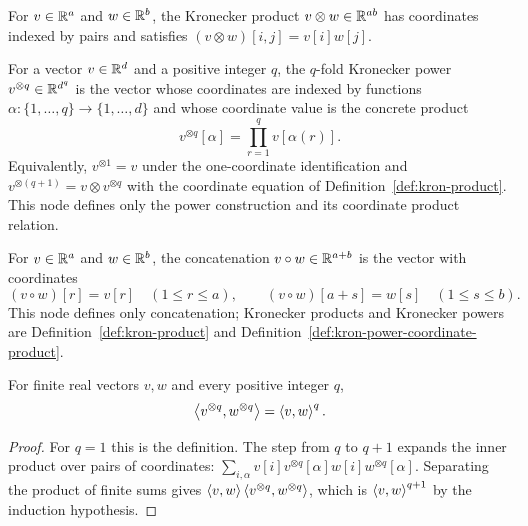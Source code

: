 \begin{definition}
  \label{def:kron-product}
  For $v\in\mathbb{R}^a$ and $w\in\mathbb{R}^b$, the Kronecker product $v\otimes w\in\mathbb{R}^{ab}$
  has coordinates indexed by pairs and satisfies $(v\otimes w)[i,j]=v[i]w[j]$.
\end{definition}

\begin{definition}
  \label{def:kron-power-coordinate-product}
  For a vector $v\in\mathbb{R}^d$ and a positive integer $q$, the $q$-fold Kronecker
  power $v^{\otimes q}\in\mathbb{R}^{d^q}$ is the vector whose coordinates are indexed
  by functions $\alpha:\{1,\ldots,q\}\to\{1,\ldots,d\}$ and whose coordinate
  value is the concrete product
  \[
    v^{\otimes q}[\alpha]=\prod_{r=1}^{q} v[\alpha(r)].
  \]
  Equivalently, $v^{\otimes 1}=v$ under the one-coordinate identification and
  $v^{\otimes(q+1)}=v\otimes v^{\otimes q}$ with the coordinate equation of
  Definition~\ref{def:kron-product}.  This node defines only the power
  construction and its coordinate product relation.
\end{definition}

\begin{definition}
  \label{def:kron-concat}
  For $v\in\mathbb{R}^a$ and $w\in\mathbb{R}^b$, the concatenation
  $v\circ w\in\mathbb{R}^{a+b}$ is the vector with coordinates
  \[
    (v\circ w)[r]=v[r]\quad(1\leq r\leq a),
    \qquad
    (v\circ w)[a+s]=w[s]\quad(1\leq s\leq b).
  \]
  This node defines only concatenation; Kronecker products and Kronecker powers
  are Definition~\ref{def:kron-product} and
  Definition~\ref{def:kron-power-coordinate-product}.
\end{definition}

\begin{lemma}
  \label{lem:kron-inner}
  For finite real vectors $v,w$ and every positive integer $q$,
  \[
    \left\langle v^{\otimes q},w^{\otimes q}\right\rangle=\left\langle v,w\right\rangle^{q}.
  \]
\end{lemma}
\begin{proof}
  For $q=1$ this is the definition.  The step from $q$ to $q+1$ expands the
  inner product over pairs of coordinates:
  $\sum_{i,\alpha} v[i]v^{\otimes q}[\alpha]w[i]w^{\otimes q}[\alpha]$.
  Separating the product of finite sums gives
  $\left\langle v,w\right\rangle\left\langle v^{\otimes q},w^{\otimes q}\right\rangle$, which is
  $\left\langle v,w\right\rangle^{q+1}$ by the induction hypothesis.
\end{proof}

